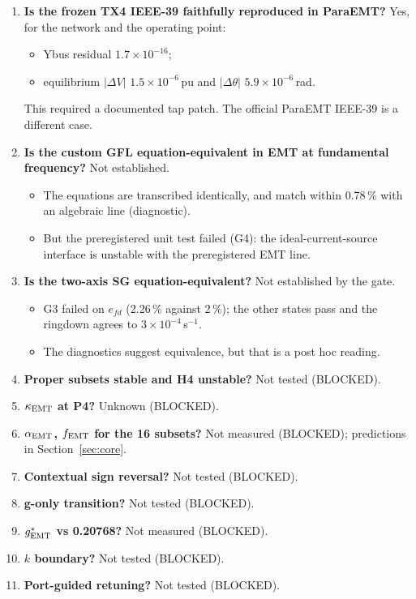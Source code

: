 \documentclass[10pt,a4paper]{article}
\newcommand{\sinv}{\,s$^{-1}$}
\begin{document}
\begin{enumerate}[leftmargin=1.8em]
\item \textbf{Is the frozen TX4 IEEE-39 faithfully reproduced in ParaEMT?}
  Yes, for the network and the operating point:
  \begin{itemize}
  \item Ybus residual $1.7\times10^{-16}$;
  \item equilibrium $|\Delta V|$ $1.5\times10^{-6}$\,pu and $|\Delta\theta|$
    $5.9\times10^{-6}$\,rad.
  \end{itemize}
  This required a documented tap patch. The official ParaEMT IEEE-39 is a
  different case.
\item \textbf{Is the custom GFL equation-equivalent in EMT at fundamental
  frequency?} Not established.
  \begin{itemize}
  \item The equations are transcribed identically, and match within 0.78\,\%
    with an algebraic line (diagnostic).
  \item But the preregistered unit test failed (G4): the ideal-current-source
    interface is unstable with the preregistered EMT line.
  \end{itemize}
\item \textbf{Is the two-axis SG equation-equivalent?} Not established by the
  gate.
  \begin{itemize}
  \item G3 failed on $e_{fd}$ (2.26\,\% against 2\,\%); the other states
    pass and the ringdown agrees to $3\times10^{-4}$\sinv.
  \item The diagnostics suggest equivalence, but that is a post hoc reading.
  \end{itemize}
\item \textbf{Proper subsets stable and H4 unstable?} Not tested (BLOCKED).
\item \textbf{$\kappa_{\rm EMT}$ at P4?} Unknown (BLOCKED).
\item \textbf{$\alpha_{\rm EMT}$, $f_{\rm EMT}$ for the 16 subsets?} Not
  measured (BLOCKED); predictions in Section~\ref{sec:core}.
\item \textbf{Contextual sign reversal?} Not tested (BLOCKED).
\item \textbf{g-only transition?} Not tested (BLOCKED).
\item \textbf{$g^*_{\rm EMT}$ vs 0.20768?} Not measured (BLOCKED).
\item \textbf{$k$ boundary?} Not tested (BLOCKED).
\item \textbf{Port-guided retuning?} Not tested (BLOCKED).

\end{enumerate}
\end{document}
